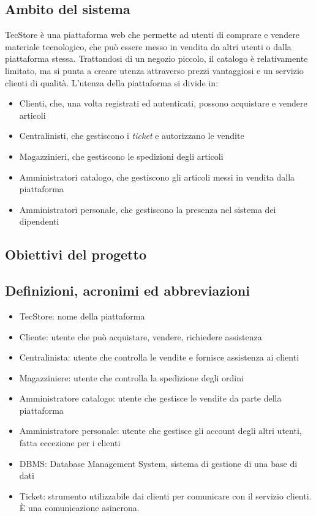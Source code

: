 \documentclass[12pt]{article}
\begin{document}
\subsection{Ambito del sistema}
TecStore è una piattaforma web che permette ad utenti di comprare e vendere materiale tecnologico, che può essere messo in vendita da altri utenti o dalla piattaforma stessa. Trattandosi di un negozio piccolo, il catalogo è relativamente limitato, ma si punta a creare utenza attraverso prezzi vantaggiosi e un servizio clienti di qualità.
L'utenza della piattaforma si divide in:
\begin{itemize}
\item Clienti, che, una volta registrati ed autenticati, possono acquistare e vendere articoli
\item Centralinisti, che gestiscono i \emph{ticket} e autorizzano le vendite
\item Magazzinieri, che gestiscono le spedizioni degli articoli
\item Amministratori catalogo, che gestiscono gli articoli messi in vendita dalla piattaforma
\item Amministratori personale, che gestiscono la presenza nel sistema dei dipendenti
\end{itemize}

\subsection{Obiettivi del progetto}

\subsection{Definizioni, acronimi ed abbreviazioni}

\begin{itemize}
\item TecStore: nome della piattaforma 
\item Cliente: utente che può acquistare, vendere, richiedere assistenza
\item Centralinista: utente che controlla le vendite e fornisce assistenza ai clienti
\item Magazziniere: utente che controlla la spedizione degli ordini
\item Amministratore catalogo: utente che gestisce le vendite da parte della piattaforma
\item Amministratore personale: utente che gestisce gli account degli altri utenti, fatta eccezione per i clienti
\item DBMS: Database Management System, sistema di gestione di una base di dati
\item Ticket: strumento utilizzabile dai clienti per comunicare con il servizio clienti. È una comunicazione asincrona.
\end{itemize}
\end{document}
